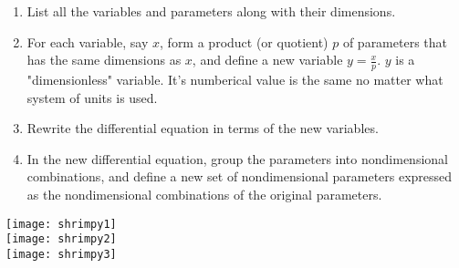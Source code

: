 \documentclass[12pt,letterpaper]{amsart}
\theoremstyle{plain}
\theoremstyle{definition}
\numberwithin{equation}{section}
\begin{document}
\begin{enumerate}
\item
List all the variables and parameters along with their dimensions.
\item
For each variable, say $x$, form a product (or quotient) $p$ of parameters that has the same dimensions as $x$, and define a new variable $y=\frac{x}{p}.$ $y$ is a "dimensionless" variable. It's numberical  value is the same no matter what system of units is used.
\item Rewrite the differential equation in terms of the new variables.
\item 
In the new differential equation, group the parameters into nondimensional combinations, and define a new set of nondimensional parameters expressed as the nondimensional combinations of the original parameters. 
\end{enumerate}

\texttt{[image: shrimpy1]}\\


\texttt{[image: shrimpy2]}\\

\texttt{[image: shrimpy3]}
\end{document}
